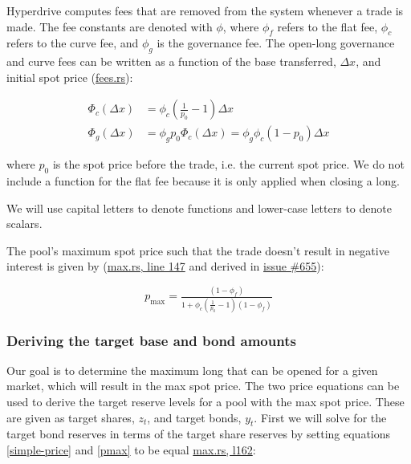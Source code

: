 Hyperdrive computes fees that are removed from the system whenever a trade is made.
The fee constants are denoted with $\phi$, where $\phi_{f}$ refers to the flat fee, $\phi_{c}$ refers to the curve fee, and $\phi_{g}$ is the governance fee.
The open-long governance and curve fees can be written as a function of the base transferred, $\Delta x$, and initial spot price (\href{https://github.com/delvtech/hyperdrive/blob/2a8c81fa401f31031be8ad87117a0a7a85a866ff/crates/hyperdrive-math/src/long/fees.rs}{fees.rs}):

\begin{align}
\label{curve-fee} \Phi_{c}(\Delta x) &= \phi_{c} \left( \tfrac{1}{p_{0}} - 1 \right) \Delta x \\
\label{gov-fee} \Phi_{g}(\Delta x) &= \phi_{g} p_{0} \Phi_{c}(\Delta x) = \phi_{g} \phi_{c} \left( 1 - p_{0} \right) \Delta x
\end{align}

where $p_{0}$ is the spot price before the trade, i.e. the current spot price.
We do not include a function for the flat fee because it is only applied when closing a long.

\begin{callout}

We will use capital letters to denote functions and lower-case letters to denote scalars.
\end{callout}

The pool's maximum spot price such that the trade doesn't result in negative interest is given by (\href{https://github.com/delvtech/hyperdrive/blob/570263e2b85c411b4097132bfe7ad2a085e3180b/crates/hyperdrive-math/src/long/max.rs#L147}{max.rs, line 147} and derived in \href{https://github.com/delvtech/hyperdrive/issues/655}{issue \#655}):

\begin{equation}\label{pmax}
p_{\text{max}} = \tfrac{(1 - \phi_{f})}{1 + \phi_{c} \left( \tfrac{1}{p_{0}}-1 \right)(1-\phi_{f})}
\end{equation}

\subsubsection{Deriving the target base and bond amounts}

Our goal is to determine the maximum long that can be opened for a given market, which will result in the max spot price.
The two price equations can be used to derive the target reserve levels for a pool with the max spot price.
These are given as target shares, $z_{t}$, and target bonds, $y_{t}$.
First we will solve for the target bond reserves in terms of the target share reserves by setting equations \eqref{simple-price} and \eqref{pmax} to be equal \href{https://github.com/delvtech/hyperdrive/blob/570263e2b85c411b4097132bfe7ad2a085e3180b/crates/hyperdrive-math/src/long/max.rs#L162}{max.rs, l162}:

